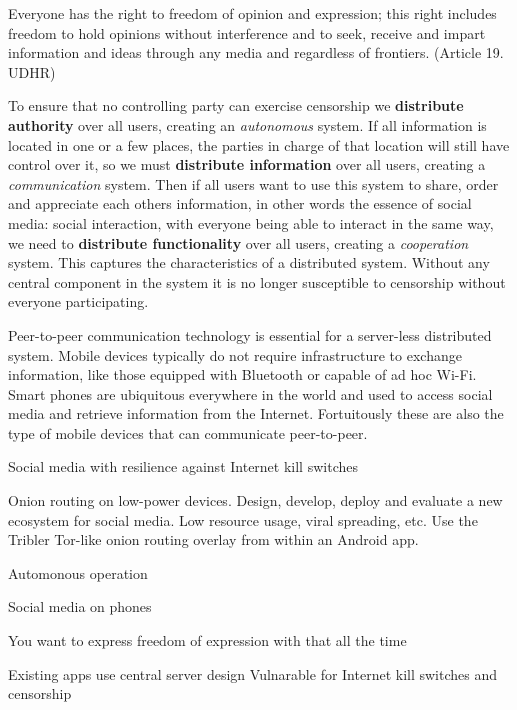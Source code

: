 \begin{displayquote}
Everyone has the right to freedom of opinion and expression; this right includes freedom to hold opinions without interference and to seek, receive and impart information and ideas through any media and regardless of frontiers.
(Article 19. UDHR)
\end{displayquote}

To ensure that no controlling party can exercise censorship we \textbf{distribute authority} over all users, creating an \emph{autonomous} system.
If all information is located in one or a few places, the parties in charge of that location will still have control over it, so we must \textbf{distribute information} over all users, creating a \emph{communication} system.
Then if all users want to use this system to share, order and appreciate each others information, in other words the essence of social media: social interaction, with everyone being able to interact in the same way, we need to  \textbf{distribute functionality} over all users, creating a \emph{cooperation} system.
This captures the characteristics of a distributed system.
Without any central component in the system it is no longer susceptible to censorship without everyone participating.

Peer-to-peer communication technology is essential for a server-less distributed system.
Mobile devices typically do not require infrastructure to exchange information, like those equipped with Bluetooth or capable of ad hoc Wi-Fi.
Smart phones are ubiquitous everywhere in the world and used to access social media and retrieve information from the Internet.
Fortuitously these are also the type of mobile devices that can communicate peer-to-peer.




Social media with resilience against Internet kill switches

Onion routing on low-power devices. Design, develop, deploy and
evaluate a new ecosystem for social media. Low resource usage, viral
spreading, etc.
Use the Tribler Tor-like onion routing overlay from within an Android app.




Automonous operation

Social media on phones

You want to express freedom of expression with that all the time %



Existing apps use central server design
Vulnarable for Internet kill switches and censorship

